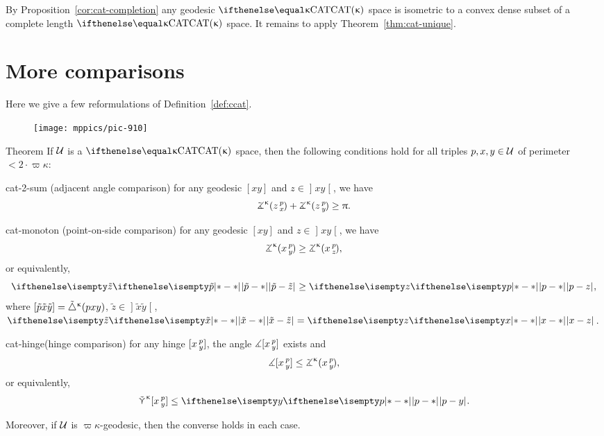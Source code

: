By Proposition~\ref{cor:cat-completion} any geodesic $\CAT{\kappa}$ space is isometric to a convex dense subset of a complete length $\CAT\kappa$ space.
It remains to apply  Theorem~\ref{thm:cat-unique}.
\qeds



\section{More comparisons}\label{sec:cat-angles}

Here we give a few reformulations of Definition~\ref{def:ccat}.

\begin{wrapfigure}{r}{25 mm}
\vskip-0mm
\centering
\texttt{[image: mppics/pic-910]}
\end{wrapfigure}

\begin{thm}{Theorem}
\label{thm:defs_of_cat} 
If $\mathcal{U}$ is a $\CAT\kappa$ space, then 
the following conditions hold for all triples $p,x,y\in \spc{U}$ of perimeter $<2\cdot\varpi\kappa$:

\begin{subthm}{cat-2-sum} (adjacent angle comparison) for any geodesic $[x y]$ and $z\in \mathopen{]}x y\mathclose{[}$, we have
\[\angk\kappa z p x
+\angk\kappa z p y\ge \pi.\]
\end{subthm}

\begin{subthm}{cat-monoton}
(point-on-side comparison) 
for any geodesic $[x y]$ and $z\in \mathopen{]}x y\mathclose{[}$, we have
\[\angk\kappa x p y\ge\angk\kappa x p z,\]
or equivalently, 
\[\dist{\tilde p}{\tilde z}{}\ge \dist{p}{z}{},\]
where $[{\tilde p}{\tilde x}{\tilde y}]={\tilde\triangle}^{\upkappa}(p x y)$, $\tilde z\in\mathopen{]} \tilde x\tilde y\mathclose{[}$, $\dist{\tilde x}{\tilde z}{}=\dist{x}{z}{}$.
\end{subthm}

\begin{subthm}{cat-hinge}(hinge comparison)
for any hinge $[x\,{}^{p}_{y}]$, the angle 
$\measuredangle[x\,{}^{p}_{y}]$ exists and
\[\mangle\hinge x p y\le\angk\kappa x p y,\]
or equivalently,
\[\side\kappa \hinge x p y\le\dist{p}{y}{}.\]
\end{subthm}

Moreover, if  $\mathcal{U}$ is  $\varpi\kappa$-geodesic, then the converse holds in each case.  

\end{thm}


